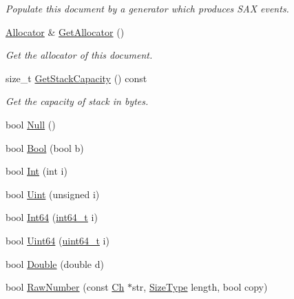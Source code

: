 \begin{DoxyCompactItemize}
\begin{DoxyCompactList}\small\item\em Populate this document by a generator which produces S\+AX events. \end{DoxyCompactList}\item 
\mbox{\hyperlink{classrapidjson_1_1_allocator}{Allocator}} \& \mbox{\hyperlink{classrapidjson_1_1_generic_document_ad92c6cd025d411258d1f2ad890e2ee3f}{Get\+Allocator}} ()
\begin{DoxyCompactList}\small\item\em Get the allocator of this document. \end{DoxyCompactList}\item 
size\+\_\+t \mbox{\hyperlink{classrapidjson_1_1_generic_document_a153e5a065ca9660673974f9df203be4b}{Get\+Stack\+Capacity}} () const
\begin{DoxyCompactList}\small\item\em Get the capacity of stack in bytes. \end{DoxyCompactList}\item 
bool \mbox{\hyperlink{classrapidjson_1_1_generic_document_ab53214e81f7402edbe57829cb1ee6c87}{Null}} ()
\item 
bool \mbox{\hyperlink{classrapidjson_1_1_generic_document_a847c975112d3d392a678e5d5b3b8f622}{Bool}} (bool b)
\item 
bool \mbox{\hyperlink{classrapidjson_1_1_generic_document_abadda08ccb7404576e74104916329c21}{Int}} (int i)
\item 
bool \mbox{\hyperlink{classrapidjson_1_1_generic_document_a56f3b745a657f2171e6a354b5652a445}{Uint}} (unsigned i)
\item 
bool \mbox{\hyperlink{classrapidjson_1_1_generic_document_a133a57e6fa510655e2933decc7361ccc}{Int64}} (\mbox{\hyperlink{stdint_8h_a414156feea104f8f75b4ed9e3121b2f6}{int64\+\_\+t}} i)
\item 
bool \mbox{\hyperlink{classrapidjson_1_1_generic_document_a3b56cdb811eea58932dcb1e425263831}{Uint64}} (\mbox{\hyperlink{stdint_8h_aec6fcb673ff035718c238c8c9d544c47}{uint64\+\_\+t}} i)
\item 
bool \mbox{\hyperlink{classrapidjson_1_1_generic_document_a332d4082d24364fba781dc3d263b4202}{Double}} (double d)
\item 
bool \mbox{\hyperlink{classrapidjson_1_1_generic_document_a278e93a502e19762fdfc337875ca34f8}{Raw\+Number}} (const \mbox{\hyperlink{classrapidjson_1_1_generic_value_adcdbc7fa85a9a41b78966d7e0dcc2ac4}{Ch}} $\ast$str, \mbox{\hyperlink{namespacerapidjson_a44eb33eaa523e36d466b1ced64b85c84}{Size\+Type}} length, bool copy)

\end{DoxyCompactItemize}
